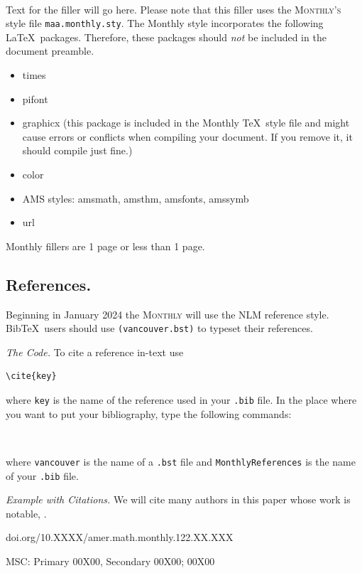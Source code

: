 \documentclass{article}
\theoremstyle{plain}
\begin{document}
\begin{filler}
[white]

\\


\noindent 
Text for the filler will go here.  Please note that this filler uses the \textsc{Monthly's} style file \texttt{maa.monthly.sty}. 
The {\sc Monthly} style incorporates the following \LaTeX\ packages.  Therefore, these packages should \textit{not} be included in the document preamble.
\begin{itemize}
\item times
\item pifont
\item graphicx (this package is included in the {\sc Monthly} \TeX\ style file and might cause errors or conflicts when compiling your document.  If you remove it, it should compile just fine.)
\item color
\item AMS styles: amsmath, amsthm, amsfonts, amssymb
\item url
\end{itemize}
{\sc Monthly} fillers are 1 page or less than 1 page.

\subsection{References.}
	Beginning in January 2024 the \textsc{Monthly} will use the NLM reference style. Bib\TeX\ users should use \texttt{(vancouver.bst)} to typeset their references.

\noindent
{\it The Code.}  To cite a reference in-text use
\begin{verbatim}
\cite{key}
\end{verbatim}
where \texttt{key} is the name of the reference used in your \texttt{.bib} file. In the place where you want to put your bibliography, type the following commands:

\begin{verbatim}


\end{verbatim}
where \texttt{vancouver} is the name of a \texttt{.bst} file and \texttt{MonthlyReferences} is the name of your \texttt{.bib} file.

\noindent
{\it Example with Citations.}  We will cite many authors in this paper whose work is notable, \cite{rose.huerbin.ea:regulation,vallancien.emberton.ea:sexual}.







\bigskip
\footnoterule
\footnotesize{doi.org/10.XXXX/amer.math.monthly.122.XX.XXX}

\footnotesize{MSC: Primary 00X00, Secondary 00X00; 00X00}

\end{filler}
\end{document}
